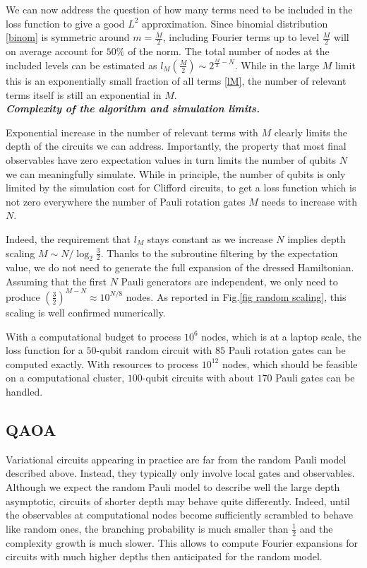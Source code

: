 \documentclass[twocolumn, amsfonts, amssymb, aps, nofootinbib]{revtex4-2}
\begin{document}
We can now address the question of how many terms need to be included in the loss function to give a good $L^2$ approximation. Since binomial distribution \eqref{binom} is symmetric around $m=\frac{M}{2}$, including Fourier terms up to level $\frac{M}{2}$ will on average account for $50\%$ of the norm. The total number of nodes at the included levels can be estimated as $l_M(\frac{M}{2})\sim 2^{\frac{M}2-N}$. While in the large $M$ limit this is an exponentially small fraction of all terms \eqref{lM}, the number of relevant terms itself is still an exponential in $M$.
\\[4pt]
\textbf{\textit{Complexity of the algorithm and simulation limits.}}

Exponential increase in the number of relevant terms with $M$ clearly limits the depth of the circuits we can address. Importantly, the property that most final observables have zero expectation values in turn limits the number of qubits $N$ we can meaningfully simulate. While in principle, the number of qubits is only limited by the simulation cost for Clifford circuits, to get a loss function which is not zero everywhere the number of Pauli rotation gates $M$ needs to increase with $N$.

Indeed, the requirement that $l_M$ stays constant as we increase $N$ implies depth scaling $M\sim N/\log_2\frac32$. Thanks to the subroutine filtering by the expectation value, we do not need to generate the full expansion of the dressed Hamiltonian. Assuming that the first $N$ Pauli generators are independent, we only need to produce $\left(\frac32\right)^{M-N}\approx 10^{N/8}$ nodes. As reported in Fig.\ref{fig random scaling}, this scaling is well confirmed numerically.

With a computational budget to process $10^6$ nodes, which is at a laptop scale, the loss function for a $50$-qubit random circuit with $85$ Pauli rotation gates can be computed exactly. With resources to process $10^{12}$ nodes, which should be feasible on a computational cluster, $100$-qubit circuits with about $170$ Pauli gates can be handled.

\subsection{QAOA}
Variational circuits appearing in practice are far from the random Pauli model described above. Instead, they typically only involve local gates and observables. Although we expect the random Pauli model to describe well the large depth asymptotic, circuits of shorter depth may behave quite differently. Indeed, until the observables at computational nodes become sufficiently scrambled to behave like random ones, the branching probability is much smaller than $\frac12$ and the complexity growth is much slower. This allows to compute Fourier expansions for circuits with much higher depths then anticipated for the random model.
\end{document}

